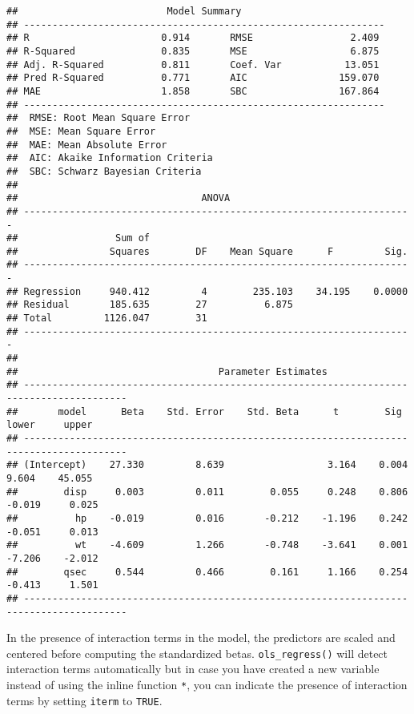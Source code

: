 \documentclass[
]{article}
\begin{document}
\begin{verbatim}
##                          Model Summary                          
## ---------------------------------------------------------------
## R                       0.914       RMSE                 2.409 
## R-Squared               0.835       MSE                  6.875 
## Adj. R-Squared          0.811       Coef. Var           13.051 
## Pred R-Squared          0.771       AIC                159.070 
## MAE                     1.858       SBC                167.864 
## ---------------------------------------------------------------
##  RMSE: Root Mean Square Error 
##  MSE: Mean Square Error 
##  MAE: Mean Absolute Error 
##  AIC: Akaike Information Criteria 
##  SBC: Schwarz Bayesian Criteria 
## 
##                                ANOVA                                 
## --------------------------------------------------------------------
##                 Sum of                                              
##                Squares        DF    Mean Square      F         Sig. 
## --------------------------------------------------------------------
## Regression     940.412         4        235.103    34.195    0.0000 
## Residual       185.635        27          6.875                     
## Total         1126.047        31                                    
## --------------------------------------------------------------------
## 
##                                   Parameter Estimates                                    
## ----------------------------------------------------------------------------------------
##       model      Beta    Std. Error    Std. Beta      t        Sig      lower     upper 
## ----------------------------------------------------------------------------------------
## (Intercept)    27.330         8.639                  3.164    0.004     9.604    45.055 
##        disp     0.003         0.011        0.055     0.248    0.806    -0.019     0.025 
##          hp    -0.019         0.016       -0.212    -1.196    0.242    -0.051     0.013 
##          wt    -4.609         1.266       -0.748    -3.641    0.001    -7.206    -2.012 
##        qsec     0.544         0.466        0.161     1.166    0.254    -0.413     1.501 
## ----------------------------------------------------------------------------------------
\end{verbatim}

In the presence of interaction terms in the model, the predictors are
scaled and centered before computing the standardized betas.
\texttt{ols\_regress()} will detect interaction terms automatically but
in case you have created a new variable instead of using the inline
function \texttt{*}, you can indicate the presence of interaction terms
by setting \texttt{iterm} to \texttt{TRUE}.
\end{document}
